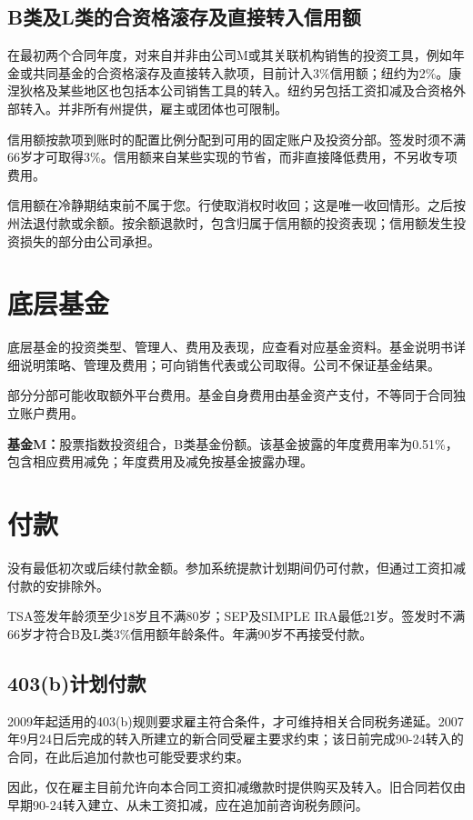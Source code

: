 \documentclass[UTF8,fontset=none,11pt,a4paper]{ctexart}
\begin{document}
\subsection*{B类及L类的合资格滚存及直接转入信用额}
在最初两个合同年度，对来自并非由公司M或其关联机构销售的投资工具，例如年金或共同基金的合资格滚存及直接转入款项，目前计入3\%信用额；纽约为2\%。康涅狄格及某些地区也包括本公司销售工具的转入。纽约另包括工资扣减及合资格外部转入。并非所有州提供，雇主或团体也可限制。


信用额按款项到账时的配置比例分配到可用的固定账户及投资分部。签发时须不满66岁才可取得3\%。信用额来自某些实现的节省，而非直接降低费用，不另收专项费用。


信用额在冷静期结束前不属于您。行使取消权时收回；这是唯一收回情形。之后按州法退付款或余额。按余额退款时，包含归属于信用额的投资表现；信用额发生投资损失的部分由公司承担。


\section*{底层基金}
底层基金的投资类型、管理人、费用及表现，应查看对应基金资料。基金说明书详细说明策略、管理及费用；可向销售代表或公司取得。公司不保证基金结果。


部分分部可能收取额外平台费用。基金自身费用由基金资产支付，不等同于合同独立账户费用。


\textbf{基金M：}股票指数投资组合，B类基金份额。该基金披露的年度费用率为0.51\%，包含相应费用减免；年度费用及减免按基金披露办理。


\section*{付款}
没有最低初次或后续付款金额。参加系统提款计划期间仍可付款，但通过工资扣减付款的安排除外。


TSA签发年龄须至少18岁且不满80岁；SEP及SIMPLE IRA最低21岁。签发时不满66岁才符合B及L类3\%信用额年龄条件。年满90岁不再接受付款。


\subsection*{403(b)计划付款}
2009年起适用的403(b)规则要求雇主符合条件，才可维持相关合同税务递延。2007年9月24日后完成的转入所建立的新合同受雇主要求约束；该日前完成90-24转入的合同，在此后追加付款也可能受要求约束。


因此，仅在雇主目前允许向本合同工资扣减缴款时提供购买及转入。旧合同若仅由早期90-24转入建立、从未工资扣减，应在追加前咨询税务顾问。
\end{document}
